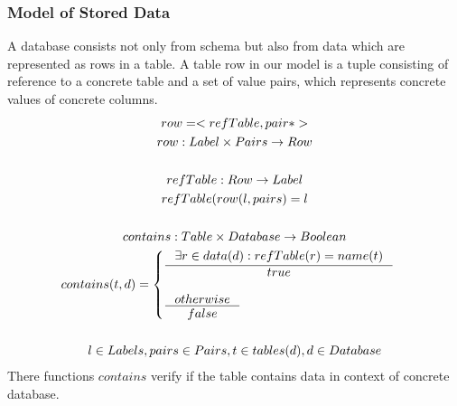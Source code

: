 \documentclass[11pt]{article}
\begin{document}

\subsubsection{Model of Stored Data}
A database consists not only from schema but also from data which are represented as rows in a table. A table row in our model is a tuple consisting of reference to a concrete table and a set of value pairs, which represents concrete values of concrete columns.
\begin{gather*}
row = < refTable, pair* > \\
row : Label \times Pairs \rightarrow Row \\ \\
refTable : Row \rightarrow Label \\
refTable(row(l, pairs) = l \\ \\
contains : Table \times Database \rightarrow Boolean \\
contains(t, d) = \begin{cases}
 \inference{\exists r \in data(d) : refTable(r) = name(t) }{true} \\ \\
  \inference{otherwise}{false}
 \end{cases} \\ \\
 l \in Labels, pairs \in Pairs, t \in tables(d), d \in Database
\end{gather*}
There functions $contains$ verify if the table contains data in context of concrete database.
\end{document}
